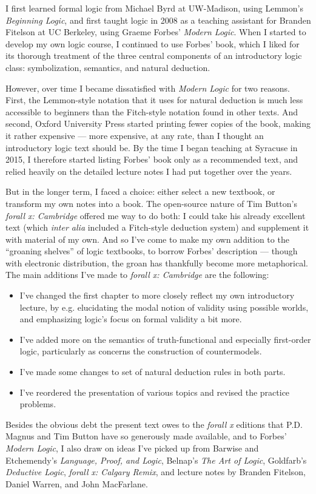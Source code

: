 I first learned formal logic from Michael Byrd at UW-Madison, using Lemmon's  \emph{Beginning Logic}, and first taught logic in 2008 as a teaching assistant for Branden Fitelson at UC Berkeley, using Graeme Forbes' \emph{Modern Logic}.  When I started to develop my own logic course, I continued to use Forbes' book, which I liked for its thorough treatment of the three central components of an introductory logic class: symbolization, semantics, and natural deduction.  

However, over time I became dissatisfied with \emph{Modern Logic} for two reasons.  First, the Lemmon-style notation that it uses for natural deduction is much less accessible to beginners than the Fitch-style notation found in other texts.  And second, Oxford University Press started printing fewer copies of the book, making it rather expensive --- more expensive, at any rate, than I thought an introductory logic text should be.  By the time I began teaching at Syracuse in 2015, I therefore started listing Forbes' book only as a recommended text, and relied heavily on the detailed lecture notes I had put together over the years.

But in the longer term, I faced a choice: either select a new textbook, or transform my own notes into a book.  The open-source nature of Tim Button's \emph{forall x: Cambridge} offered me way to do both: I could take his already excellent text (which \emph{inter alia} included a Fitch-style deduction system) and supplement it with material of my own.  And so I've come to make my own addition to the ``groaning shelves'' of logic textbooks, to borrow Forbes' description --- though with electronic distribution, the groan has thankfully become more metaphorical. The main additions I've made to \emph{forall x: Cambridge} are the following:
\begin{itemize}
\item I've changed the first chapter to more closely reflect my own introductory lecture, by e.g. elucidating the modal notion of validity using possible worlds, and emphasizing logic's focus on formal validity a bit more.
\item I've added more on the semantics of truth-functional and especially first-order logic, particularly as concerns the construction of countermodels.  
\item I've made some changes to set of natural deduction rules in both parts.
\item I've reordered the presentation of various topics and revised the practice problems.
\end{itemize}
Besides the obvious debt the present text owes to the \emph{forall x} editions that P.D. Magnus and Tim Button have so generously made available,  and to Forbes' \emph{Modern Logic}, I also draw on ideas I've picked up from Barwise and Etchemendy's \emph{Language, Proof, and Logic}, Belnap's \emph{The Art of Logic}, Goldfarb's \emph{Deductive Logic}, \emph{forall x: Calgary Remix}, and lecture notes by Branden Fitelson,  Daniel Warren, and John MacFarlane.


